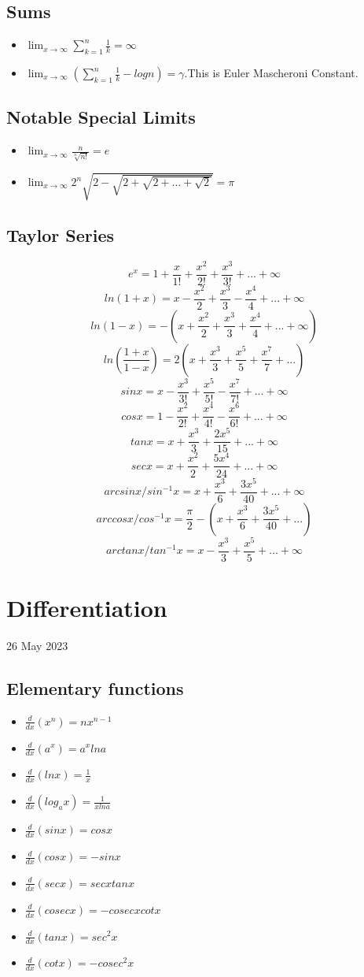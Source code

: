 \documentclass[twocolumn, 10pt]{article}
\begin{document}
\subsection{Sums}
\begin{itemize}
\item $\lim_{x \to \infty} \sum_{k=1}^{n} \frac{1}{k}= 
\infty $
\item $\lim_{x \to \infty} (\sum_{k=1}^{n} \frac{1}{k}-logn)= 
\gamma $.This is Euler Mascheroni Constant.
\end{itemize}
\subsection{Notable Special Limits}
\begin{itemize}
\item $\lim_{x \to \infty} \frac{n}{\sqrt[n]{n!}}=e$
\item $\lim_{x \to \infty} 2^n \sqrt{2- \sqrt{2 + \sqrt{2 +...+ \sqrt{2}}}}= \pi $
\end{itemize}
\subsection{Taylor Series}
$$e^x = 1 + \frac{x}{1!}+ \frac{x^{2}}{2!}+ \frac{x^{3}}{3!}+...+ \infty$$
$$ln(1+x) = x - \frac{x^{2}}{2}+ \frac{x^{3}}{3}- \frac{x^{4}}{4}+...+ \infty$$
$$ln(1-x) = -(x + \frac{x^{2}}{2}+ \frac{x^{3}}{3}+ \frac{x^{4}}{4}+...+ \infty)$$
$$ln(\frac{1+x}{1-x}) = 2(x+ \frac{x^{3}}{3}+ \frac{x^{5}}{5}+ \frac{x^{7}}{7}+...)$$
$$sinx = x - \frac{x^{3}}{3!}+ \frac{x^{5}}{5!}- \frac{x^{7}}{7!}+...+ \infty$$
$$cosx = 1 - \frac{x^{2}}{2!}+ \frac{x^{4}}{4!}- \frac{x^{6}}{6!}+...+ \infty$$
$$tanx = x + \frac{x^{3}}{3}+ \frac{2x^{5}}{15}+...+ \infty$$
$$secx = x + \frac{x^{2}}{2}+ \frac{5x^{4}}{24}+...+ \infty$$
$$arcsinx/sin^{-1}x = x + \frac{x^{3}}{6}+ \frac{3x^{5}}{40}+...+ \infty$$
$$arccosx/cos^{-1}x = \frac{\pi}{2}- (x + \frac{x^{3}}{6}+ \frac{3x^{5}}{40}+...)$$
$$arctanx/tan^{-1}x = x - \frac{x^{3}}{3}+ \frac{x^{5}}{5}+...+ \infty$$
\section{Differentiation}
26 May 2023
\subsection{Elementary functions}
\begin{itemize}
\item $\frac{d}{dx} (x^n)=nx^{n-1}$
\item $\frac{d}{dx} (a^x)=a^x lna$
\item $\frac{d}{dx} (lnx)=\frac{1}{x}$
\item $\frac{d}{dx} (log_a x)=\frac{1}{xlna}$
\item $\frac{d}{dx} (sinx)=cosx$
\item $\frac{d}{dx} (cosx)=-sinx$
\item $\frac{d}{dx} (secx)=secxtanx$
\item $\frac{d}{dx} (cosecx)=-cosecxcotx$
\item $\frac{d}{dx} (tanx)=sec^2x$
\item $\frac{d}{dx} (cotx)=-cosec^2x$
\end{itemize}
\end{document}

